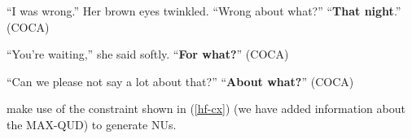 \documentclass[output=paper
                ,modfonts
                ,nonflat
	        ,collection
	        ,collectionchapter
	        ,collectiontoclongg
 	        ,biblatex
                ,babelshorthands
                ,newtxmath
                ,draftmode
                ,colorlinks, citecolor=brown
]{./langsci/langscibook}
\begin{document}
{\ea ``I was wrong.'' Her brown eyes twinkled. ``Wrong about what?'' ``\textbf{That night}.'' (COCA) \label{34a}\z

\ea ``You're waiting,'' she said softly. ``\textbf{For what?}'' (COCA) \label{35} \z

\ea ``Can we please not say a lot about that?'' ``\textbf{About what?}'' (COCA) \label{36} \z

\citet[304]{Ginzburg:Sag:2000} make use of the constraint shown in (\ref{hf-cx}) (we have added information about the MAX-QUD) to generate NUs.




                                 }
\end{document}
